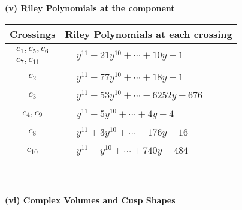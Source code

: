 \documentclass[1p]{elsarticle_modified}
\theoremstyle{definition}
\begin{document}
\newpage\renewcommand{\arraystretch}{1}
\flushleft \textbf{(v) Riley Polynomials at the component}\newline \\
\begin{tabular}{m{50pt}|m{274pt}}
Crossings & \hspace{64pt}Riley Polynomials at each crossing \\
\hline $$\begin{aligned}c_{1},c_{5},c_{6}\\c_{7},c_{11}\end{aligned}$$&$\begin{aligned}
&y^{11}-21 y^{10}+\cdots+10 y-1
\end{aligned}$\\
\hline $$\begin{aligned}c_{2}\end{aligned}$$&$\begin{aligned}
&y^{11}-77 y^{10}+\cdots+18 y-1
\end{aligned}$\\
\hline $$\begin{aligned}c_{3}\end{aligned}$$&$\begin{aligned}
&y^{11}-53 y^{10}+\cdots-6252 y-676
\end{aligned}$\\
\hline $$\begin{aligned}c_{4},c_{9}\end{aligned}$$&$\begin{aligned}
&y^{11}-5 y^{10}+\cdots+4 y-4
\end{aligned}$\\
\hline $$\begin{aligned}c_{8}\end{aligned}$$&$\begin{aligned}
&y^{11}+3 y^{10}+\cdots-176 y-16
\end{aligned}$\\
\hline $$\begin{aligned}c_{10}\end{aligned}$$&$\begin{aligned}
&y^{11}- y^{10}+\cdots+740 y-484
\end{aligned}$\\
\hline
\end{tabular}\\~\\
\newpage\flushleft \textbf{(vi) Complex Volumes and Cusp Shapes}
\end{document}
